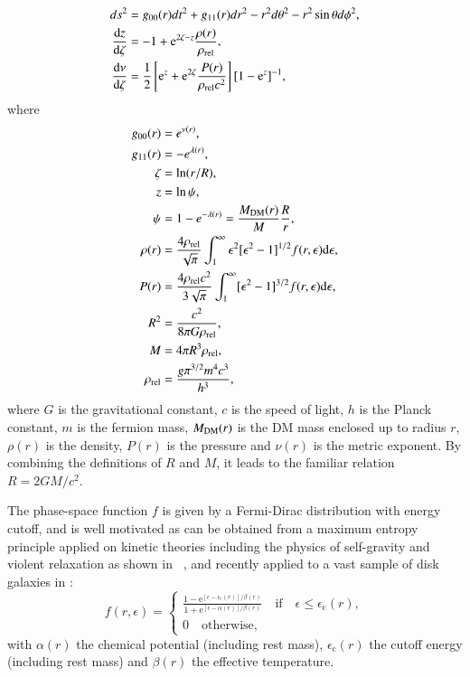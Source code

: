 \documentclass[twocolumn]{aa}
\begin{document}
\begin{align}
   \label{sode}
   ds^2 &= g_{00}(r)dt^2 + g_{11}(r)dr^2 -r^2d\theta^2 -r^2\sin\theta d\phi^2, \\
   \frac{\mathrm{d}z}{\mathrm{d}\zeta} & = -1+\mathrm{e}^{2\zeta-z}\frac{\rho(r)}{\rho_{\rm{rel}}},\\
   \frac{\mathrm{d}\nu}{\mathrm{d}\zeta} & = \frac{1}{2}\left[\mathrm{e}^{z}+\mathrm{e}^{2\zeta}\frac{P(r)}{\rho_{\rm{rel}}c^2}\right][1-\mathrm{e}^{z}]^{-1},
    \label{sode2}
\end{align}
where
\begin{align}
   g_{00}(r) &= e^{\nu(r)},\\
   g_{11}(r) &= -e^{\lambda(r)},\\
   \zeta &= \ln(r/R),\\
   z &=\ln\psi,\\
   \psi &= 1-e^{-\lambda(r)} = \frac{M_{\rm{DM}}(r)}{M}\frac{R}{r},\label{mass_dm}\\
   \rho(r)&=\frac{4\rho_{\rm rel}}{\sqrt{\pi}}\int^\infty_1\epsilon^2[\epsilon^2-1]^{1/2}f(r,\epsilon)\mathrm{d}\epsilon,\\
   P(r)&=\frac{4\rho_{\rm rel}c^2}{3\sqrt{\pi}}\int^\infty_1[\epsilon^2-1]^{3/2}f(r,\epsilon)\mathrm{d}\epsilon,\\
   R^2 &= \frac{c^2}{8\pi G \rho_{\rm{rel}}},\\
   M &= 4\pi R^3 \rho_{\rm{rel}},\\
   \rho_{\rm{rel}}&= \frac{ g\pi^{3/2} m^4 c^3}{h^3},
\end{align}
where $G$ is the gravitational constant, $c$ is the speed of light, $h$ is the Planck constant, $m$ is the fermion mass, $M_{\rm{DM}}(r)$ is the DM mass enclosed up to radius $r$, $\rho(r)$ is the density, $P(r)$ is the pressure and $\nu(r)$ is the metric exponent. By combining the definitions of $R$ and $M$, it leads to the familiar relation $R=2GM/c^2$.

The phase-space function $f$ is given by a Fermi-Dirac distribution with energy cutoff, and is well motivated as can be obtained from a maximum entropy principle applied on kinetic theories including the physics of self-gravity and violent relaxation as shown in \citealp{2004PhyA..332...89C}~\citep[for a review see also][]{2022PhyA..60628089C}, and recently applied to a vast sample of disk galaxies in \cite{2023ApJ...945....1K}:
\begin{equation}
f(r,\epsilon)=
   \begin{cases}
      \frac{\displaystyle{1-\mathrm {e}^{[\epsilon-\epsilon_\mathrm{c}(r)]/\beta(r)}}}
      {\displaystyle{1+\mathrm {e}^{[\epsilon-\alpha(r)]/\beta(r)}}}\quad\mathrm{if}\quad \epsilon \leq \epsilon_\mathrm{c}(r),\\
      0\quad \mathrm{otherwise},
   \end{cases}
\end{equation}
with $\alpha(r)$ the chemical potential (including rest mass), $\epsilon_\mathrm{c}(r)$ the cutoff
energy (including rest mass) and $\beta(r)$ the effective temperature.
\end{document}
